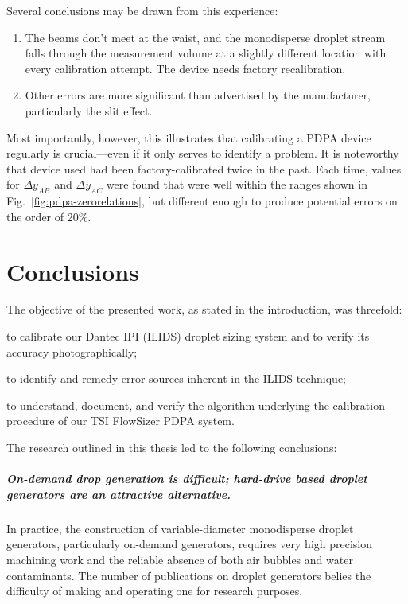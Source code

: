 \documentclass[11.5pt,oneside]{book}
\newcommand*{\figref}[1]{Fig.~\ref{#1}}
\begin{document}
Several conclusions may be drawn from this experience:
\begin{enumerate}
  \item The beams don't meet at the waist, and the monodisperse droplet stream
    falls through the measurement volume at a slightly different location with
    every calibration attempt. The device needs factory recalibration.
  \item Other errors are more significant than advertised by the manufacturer,
    particularly the slit effect.
\end{enumerate}

Most importantly, however, this illustrates that calibrating a PDPA device
regularly is crucial---even if it only serves to identify a problem. It is
noteworthy that device used had been factory-calibrated twice in the past. Each
time, values for $\Delta y_{AB}$ and $\Delta y_{AC}$ were found that were well
within the ranges shown in \figref{fig:pdpa-zerorelations}, but different enough
to produce potential errors on the order of 20\%.

\chapter{Conclusions}
The objective of the presented work, as stated in the introduction, was threefold:
\begin{alist}
\item to calibrate our Dantec IPI (ILIDS) droplet sizing system and to verify
        its accuracy photographically;
\item to identify and remedy error sources inherent in the ILIDS technique;
\item to understand, document, and verify the algorithm underlying the
        calibration procedure of our TSI FlowSizer PDPA system.
\end{alist}

The research outlined in this thesis led to the following conclusions:

\paragraph{On-demand drop generation is difficult; hard-drive based
droplet generators are an attractive alternative.} In practice, the
construction of variable-diameter monodisperse droplet generators,
particularly on-demand generators, requires very high precision
machining work and the reliable absence of both air bubbles and water
contaminants. The number of publications on droplet generators belies
the difficulty of making and operating one for research purposes.
\end{document}

